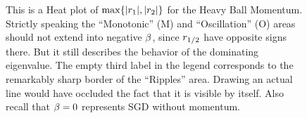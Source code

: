 \begin{figure}[h]
	\centering
	\def\svgwidth{1\textwidth}
	
	\caption{
		This is a Heat plot of \(\max\{|r_1|,|r_2|\}\) for the Heavy
		Ball Momentum.  Strictly speaking the ``Monotonic'' (M) and
		``Oscillation'' (O) areas should not extend into negative \(\beta\),
		since \(r_{1/2}\) have opposite signs there. But it still describes
		the behavior of the dominating eigenvalue. The empty third label in the
		legend corresponds to the remarkably sharp border of the ``Ripples'' area.
		Drawing an actual line would have occluded the fact that it is visible by
		itself. Also recall that \(\beta=0\) represents SGD without momentum.
	}
	\label{fig: annotated heavy ball rates}
\end{figure}

